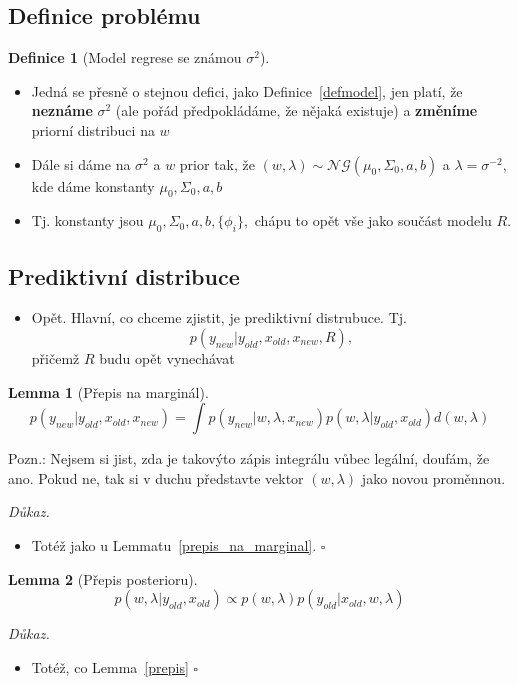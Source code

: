 \documentclass{article}
\newenvironment{pitemize}{
\begin{itemize}
  \setlength{\itemsep}{5pt}
  \setlength{\parskip}{0pt}
  \setlength{\parsep}{0pt}
}{\end{itemize}}
\newenvironment{pproof}{
\noindent\emph{Důkaz.}
\begin{pitemize}
}{\hfill$\square$\end{pitemize}}
\newcommand{\NoG}{\mathcal{NG}}
\newtheorem{lemma}{Lemma}
\theoremstyle{definition}
\newtheorem{definice}{Definice}
\begin{document}
\subsection{Definice problému}


\begin{definice}[Model regrese se známou $\sigma^2$]
\label{defmodel_2}
\end{definice}
\begin{itemize}
\item Jedná se přesně o stejnou defici, jako Definice~\ref{defmodel}, jen platí, že \textbf{neznáme} $\sigma^2$ (ale pořád předpokládáme, že nějaká existuje) a \textbf{změníme} priorní distribuci na $w$

\item Dále si dáme na $\sigma^2$ a $w$ prior tak, že $(w,\lambda) \sim \NoG(\mu_0,\Sigma_0,a,b)$ a $\lambda = \sigma^{-2}$, kde dáme konstanty $\mu_0,\Sigma_0,a,b$
\item Tj. konstanty jsou $\mu_0, \Sigma_0, a,b,\{\phi_i\},$ chápu to opět vše jako součást modelu $R$.
\end{itemize}

\subsection{Prediktivní distribuce}
\begin{itemize}
\item Opět. Hlavní, co chceme zjistit, je prediktivní distrubuce. Tj. $$p(y_{new}|y_{old},x_{old},x_{new},R),$$ přičemž $R$ budu opět vynechávat
\end{itemize}


\begin{lemma}[Přepis na marginál]
\label{prepis_na_marginal_2}
$$p(y_{new}|y_{old},x_{old},x_{new})=\int p(y_{new}|w,\lambda,x_{new})p(w, \lambda|y_{old},x_{old})d(w,\lambda)$$
\end{lemma}

Pozn.: Nejsem si jist, zda je takovýto zápis integrálu vůbec legální, doufám, že ano. Pokud ne, tak si v duchu představte vektor $(w,\lambda)$ jako novou proměnnou.

\begin{pproof}
\item Totéž jako u Lemmatu~\ref{prepis_na_marginal}.
\end{pproof}


\begin{lemma}[Přepis posterioru]
\label{prepis_2}
$$p(w,\lambda|y_{old},x_{old})\propto p(w,\lambda)p(y_{old}|x_{old},w,\lambda)$$

\end{lemma}
\begin{pproof}
\item Totéž, co Lemma~\ref{prepis}
\end{pproof}
\end{document}
